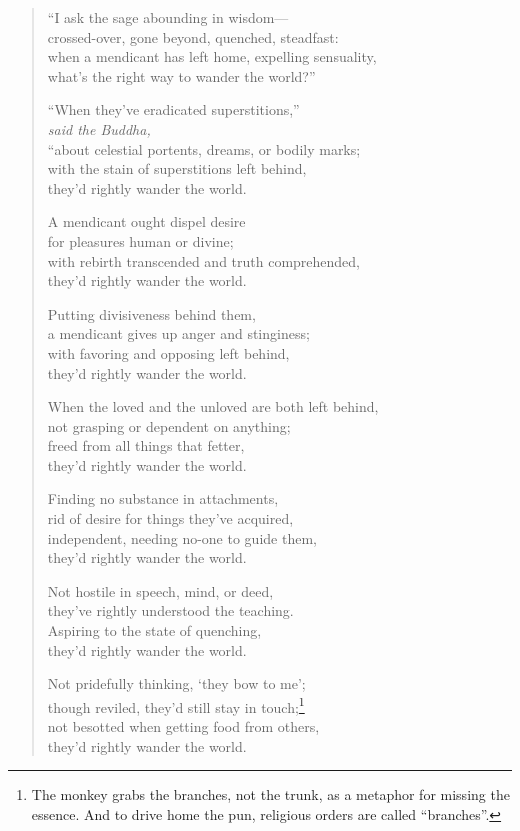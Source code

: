 \documentclass[12pt,openany]{book}%
\newcommand*{\scspeaker}[1]{\hspace{2em}\textit{#1}}
\begin{document}
\begin{verse}%
“I ask the sage abounding in wisdom—\\
crossed-over, gone beyond, quenched, steadfast: \\
when a mendicant has left home, expelling sensuality, \\
what’s the right way to wander the world?” 

“When they’ve eradicated superstitions,” \\
\scspeaker{said the Buddha, }\\
“about celestial portents, dreams, or bodily marks; \\
with the stain of superstitions left behind, \\
they’d rightly wander the world. 

A mendicant ought dispel desire \\
for pleasures human or divine; \\
with rebirth transcended and truth comprehended, \\
they’d rightly wander the world. 

Putting divisiveness behind them, \\
a mendicant gives up anger and stinginess; \\
with favoring and opposing left behind, \\
they’d rightly wander the world. 

When the loved and the unloved are both left behind, \\
not grasping or dependent on anything; \\
freed from all things that fetter, \\
they’d rightly wander the world. 

Finding no substance in attachments, \\
rid of desire for things they’ve acquired, \\
independent, needing no-one to guide them, \\
they’d rightly wander the world. 

Not hostile in speech, mind, or deed, \\
they’ve rightly understood the teaching. \\
Aspiring to the state of quenching, \\
they’d rightly wander the world. 

Not pridefully thinking, ‘they bow to me’; \\
though reviled, they’d still stay in touch;\footnote{The monkey grabs the branches, not the trunk, as a metaphor for missing the essence. And to drive home the pun, religious orders are called “branches”. } \\
not besotted when getting food from others, \\
they’d rightly wander the world. 


\end{verse}
\end{document}
